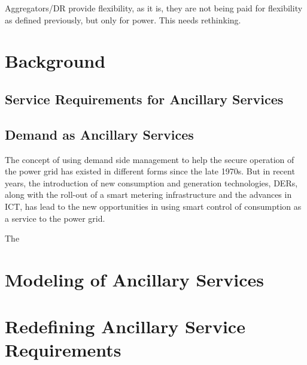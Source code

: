 Aggregators/DR provide flexibility, as it is, they are not being paid for flexibility as defined previously, but only for power. This needs rethinking.
\section{Background} %
\label{sec:backgroundservices}
\subsection{Service Requirements for Ancillary Services} %
\label{sub:servreqAS}

\subsection{Demand as Ancillary Services} %
\label{sub:demandAS}
The concept of using demand side management to help the secure operation of the power grid has existed in different forms since the late 1970s. But in recent years, the introduction of new consumption and generation technologies, \ie DERs, along with the roll-out of a smart metering infrastructure and the advances in ICT, has lead to the new opportunities in using smart control of consumption as a service to the power grid. 

The 

\section{Modeling of Ancillary Services} %
\label{sec:Modeling of Ancillary Services}


\section{Redefining Ancillary Service Requirements} %
\label{sec:Redefining Ancillary Service Requirements}


